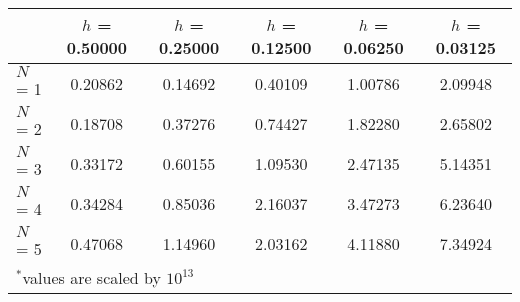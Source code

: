\documentclass{standalone}
\begin{document}
\begin{tabular}{@{} l *{5}{c} @{}}
    \toprule
    & $h$ = 0.50000 & $h$ = 0.25000 & $h$ = 0.12500 & $h$ = 0.06250 & $h$ = 0.03125 \\
    \midrule
    $N$ = 1 & 0.20862 & 0.14692 & 0.40109 & 1.00786 & 2.09948 \\
    $N$ = 2 & 0.18708 & 0.37276 & 0.74427 & 1.82280 & 2.65802 \\
    $N$ = 3 & 0.33172 & 0.60155 & 1.09530 & 2.47135 & 5.14351 \\
    $N$ = 4 & 0.34284 & 0.85036 & 2.16037 & 3.47273 & 6.23640 \\
    $N$ = 5 & 0.47068 & 1.14960 & 2.03162 & 4.11880 & 7.34924 \\
    \midrule
    \multicolumn{6}{l}{\footnotesize $^*$values are scaled by $10^{13}$} \\
    \bottomrule
\end{tabular}
\end{document}
